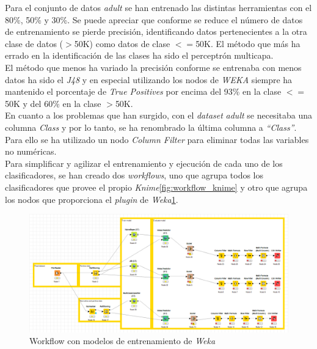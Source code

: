 \documentclass[10pt,a4paper]{article}
\begin{document}
Para el conjunto de datos \emph{adult} se han entrenado las distintas herramientas con el 80\%, 50\% y 30\%.
Se puede apreciar que conforme se reduce el número de datos de entrenamiento se pierde precisión, identificando datos pertenecientes a la otra clase de datos ($>$50K) como datos de clase $<=$50K. El método que más ha errado en la identificación de las clases ha sido el perceptrón multicapa.\\
El método que menos ha variado la precisión conforme se entrenaba con menos datos ha sido el \emph{J48} y en especial utilizando los nodos de \emph{WEKA} siempre ha mantenido el porcentaje de \emph{True Positives} por encima del 93\% en la clase $<=$50K y del 60\% en la clase $>$50K.\\

En cuanto a los problemas que han surgido, con el \emph{dataset} \emph{adult} se necesitaba una columna \emph{Class} y por lo tanto, se ha renombrado la última columna a \emph{``Class''}. Para ello se ha utilizado un nodo \emph{Column Filter} para eliminar todas las variables no numéricas.\\

Para simplificar y agilizar el entrenamiento y ejecución de cada uno de los clasificadores, se han creado dos \textit{workflows}, uno que agrupa todos los clasificadores que provee el propio \textit{Knime}\ref{fig:workflow_knime} y otro que agrupa los nodos que proporciona el \textit{plugin} de \textit{Weka}\ref{fig:workflow_weka}.
\begin{figure}[h!]
	\centering
	\includegraphics[scale=0.5]{images/workflow_ej3_weka.png}
	\caption{Workflow con modelos de entrenamiento de \textit{Weka}}
	\label{fig:workflow_weka}
\end{figure}
\end{document}
